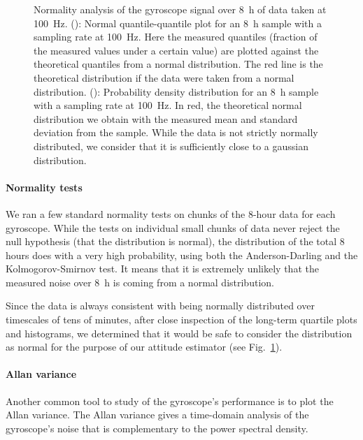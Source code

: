 \begin{figure}[!ht]
\caption[Normality analysis]{Normality analysis of the gyroscope signal over \SI{8}{\hour} of data taken at \SI{100}{\hertz}. (): Normal quantile-quantile plot for an \SI{8}{\hour} sample with a sampling rate at \SI{100}{\hertz}. Here the measured quantiles (fraction of the measured values under a certain value) are plotted against the theoretical quantiles from a normal distribution. The red line is the theoretical distribution if the data were taken from a normal distribution. (): Probability density distribution for an \SI{8}{\hour} sample with a sampling rate at \SI{100}{\hertz}. In red, the theoretical normal distribution we obtain with the measured mean and standard deviation from the sample. While the data is not strictly normally distributed, we consider that it is sufficiently close to a gaussian distribution.}
\label{fig:gyroprobdensity}
\end{figure}

\paragraph{Normality tests}

We ran a few standard normality tests on chunks of the 8-hour data for each gyroscope. While the tests on individual small chunks of data never reject the null hypothesis (that the distribution is normal), the distribution of the total 8 hours does with a very high probability, using both the Anderson-Darling and the Kolmogorov-Smirnov test. It means that it is extremely unlikely that the measured noise over \SI{8}{\hour} is coming from a normal distribution.

Since the data is always consistent with being normally distributed over timescales of tens of minutes, after close inspection of the long-term quartile plots and histograms, we determined that it would be safe to consider the distribution as normal for the purpose of our attitude estimator (see Fig.~\ref{fig:gyroprobdensity}). 




\paragraph{Allan variance}


Another common tool to study of the gyroscope's performance is to plot the Allan variance. The Allan variance gives a time-domain analysis of the gyroscope's noise that is complementary to the power spectral density.

